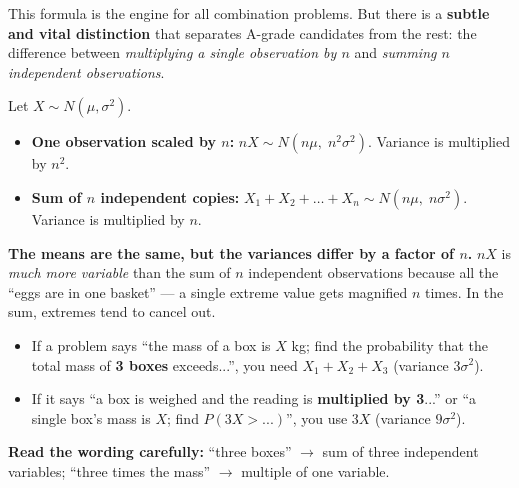 \documentclass[11pt]{article}
\begin{document}
This formula is the engine for all combination problems. But there is a \textbf{subtle and vital distinction} that separates A-grade candidates from the rest: the difference between \emph{multiplying a single observation by $n$} and \emph{summing $n$ independent observations}.

\begin{aretenir}
Let $X \sim N(\mu,\sigma^2)$.
\begin{itemize}
    \item \textbf{One observation scaled by $n$:} $nX \sim N(n\mu,\; n^2\sigma^2)$. \quad Variance is multiplied by $n^2$.
    \item \textbf{Sum of $n$ independent copies:} $X_1 + X_2 + \dots + X_n \sim N(n\mu,\; n\sigma^2)$. \quad Variance is multiplied by $n$.
\end{itemize}
\textbf{The means are the same, but the variances differ by a factor of $n$.} 
$nX$ is \emph{much more variable} than the sum of $n$ independent observations because all the ``eggs are in one basket'' — a single extreme value gets magnified $n$ times. In the sum, extremes tend to cancel out.
\end{aretenir}

\begin{attention}
\begin{itemize}
    \item If a problem says ``the mass of a box is $X$ kg; find the probability that the total mass of \textbf{3 boxes} exceeds...'', you need $X_1+X_2+X_3$ (variance $3\sigma^2$).
    \item If it says ``a box is weighed and the reading is \textbf{multiplied by 3}...'' or ``a single box's mass is $X$; find $P(3X > ...)$'', you use $3X$ (variance $9\sigma^2$).
\end{itemize}
\textbf{Read the wording carefully:} ``three boxes'' $\rightarrow$ sum of three independent variables; ``three times the mass'' $\rightarrow$ multiple of one variable.
\end{attention}
\end{document}
